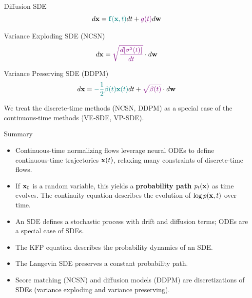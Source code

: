 \documentclass{beamer}
\begin{document}
\begin{frame}{Diffusion SDE}
	\vspace{-0.3cm}
	\[
		d\mathbf{x} = {\color{teal}\mathbf{f}(\mathbf{x}, t)} dt + {\color{violet}g(t)} d \mathbf{w}
	\]
    \eqpause
	\vspace{-0.3cm}
	\begin{block}{Variance Exploding SDE (NCSN)}
		\vspace{-0.3cm}
		\[
			d \mathbf{x} = {\color{violet}\sqrt{\frac{ d [\sigma^2(t)]}{dt}}} \cdot d \mathbf{w}
		\]
		\vspace{-0.3cm}
	\end{block}
	\begin{block}{Variance Preserving SDE (DDPM)}
		\vspace{-0.3cm}
		\[
			d \mathbf{x} = {\color{teal}- \frac{1}{2} \beta(t) \mathbf{x}(t)} dt + {\color{violet}\sqrt{\beta(t)}} \cdot d \mathbf{w}
		\]
	\end{block}
	We treat the discrete-time methods (NCSN, DDPM) as a special case of the continuous-time methods (VE-SDE, VP-SDE).
\end{frame}
\begin{frame}{Summary}
	\begin{itemize}
		\item Continuous-time normalizing flows leverage neural ODEs to define continuous-time trajectories $\mathbf{x}(t)$, relaxing many constraints of discrete-time flows.
		\vfill
		\item If $\mathbf{x}_0$ is a random variable, this yields a \textbf{probability path} $p_t(\mathbf{x})$ as time evolves. The continuity equation describes the evolution of $\log p(\mathbf{x}, t)$ over time.
		\vfill
		\item An SDE defines a stochastic process with drift and diffusion terms; ODEs are a special case of SDEs.
		\vfill
		\item The KFP equation describes the probability dynamics of an SDE.
		\vfill
		\item The Langevin SDE preserves a constant probability path.
		\vfill
		\item Score matching (NCSN) and diffusion models (DDPM) are discretizations of SDEs (variance exploding and variance preserving).
	\end{itemize}
\end{frame}
\end{document}
